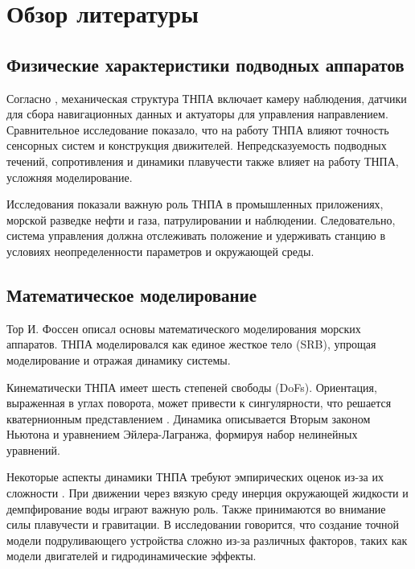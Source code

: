 \chapter{Обзор литературы}
\label{chap:lr}


\section{Физические характеристики подводных аппаратов}

    Согласно \cite{rov_review}, механическая структура ТНПА включает камеру наблюдения, датчики для сбора навигационных данных и актуаторы для управления направлением. Сравнительное исследование \cite{overview2} показало, что на работу ТНПА влияют точность сенсорных систем и конструкция движителей. Непредсказуемость подводных течений, сопротивления и динамики плавучести также влияет на работу ТНПА, усложняя моделирование.

    Исследования \cite{rov_application, overview} показали важную роль ТНПА в промышленных приложениях, морской разведке нефти и газа, патрулировании и наблюдении. Следовательно, система управления должна отслеживать положение и удерживать станцию в условиях неопределенности параметров и окружающей среды.

\section{Математическое моделирование}

    Тор И. Фоссен \cite{fossen:guidance} описал основы математического моделирования морских аппаратов. ТНПА моделировался как единое жесткое тело (SRB), упрощая моделирование и отражая динамику системы.

    Кинематически ТНПА имеет шесть степеней свободы (DoFs). Ориентация, выраженная в углах поворота, может привести к сингулярности, что решается кватернионным представлением \cite{quat_smc}. Динамика описывается Вторым законом Ньютона и уравнением Эйлера-Лагранжа, формируя набор нелинейных уравнений.

    Некоторые аспекты динамики ТНПА требуют эмпирических оценок из-за их сложности \cite{fossen:guidance, bluerov}. При движении через вязкую среду инерция окружающей жидкости и демпфирование воды играют важную роль. Также принимаются во внимание силы плавучести и гравитации. В исследовании \cite{bluerov} говорится, что создание точной модели подруливающего устройства сложно из-за различных факторов, таких как модели двигателей и гидродинамические эффекты.

